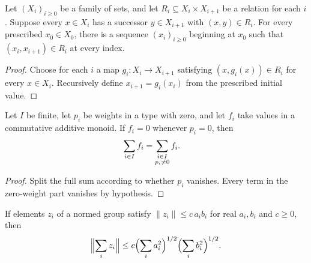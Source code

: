 \begin{lemma}
    \label{lem:dependent_sequence_choice}
    \leanok
    Let $(X_i)_{i\ge0}$ be a family of sets, and let
    $R_i\subseteq X_i\times X_{i+1}$ be a relation for each $i$.
    Suppose every $x\in X_i$ has a successor $y\in X_{i+1}$ with
    $(x,y)\in R_i$. For every prescribed $x_0\in X_0$, there is a sequence
    $(x_i)_{i\ge0}$ beginning at $x_0$ such that
    $(x_i,x_{i+1})\in R_i$ at every index.
\end{lemma}

\begin{proof}\leanok
    Choose for each $i$ a map $g_i:X_i\to X_{i+1}$ satisfying
    $(x,g_i(x))\in R_i$ for every $x\in X_i$.
    Recursively define $x_{i+1}=g_i(x_i)$ from the prescribed initial value.
\end{proof}

\begin{lemma}
    \label{lem:finset_sum_subtype_ne_zero}
    \leanok
    Let $I$ be finite, let $p_i$ be weights in a type with zero, and let $f_i$
    take values in a commutative additive monoid. If $f_i=0$ whenever $p_i=0$,
    then
    \begin{align}
        \sum_{i\in I}f_i & =\sum_{\substack{i\in I \\p_i\ne0}}f_i.
        \notag
    \end{align}
\end{lemma}

\begin{proof}\leanok
    Split the full sum according to whether $p_i$ vanishes. Every term in the
    zero-weight part vanishes by hypothesis.
\end{proof}

\begin{lemma}
    \label{lem:norm_sum_le_mul_sqrt_mul_sqrt}
    \leanok
    If elements $z_i$ of a normed group satisfy
    $\lVert z_i\rVert\le c\,a_ib_i$ for real $a_i,b_i$ and $c\ge0$, then
    \begin{align}
        \Bigl\lVert\sum_iz_i\Bigr\rVert
        \le c\Bigl(\sum_ia_i^2\Bigr)^{1/2}\Bigl(\sum_ib_i^2\Bigr)^{1/2}.
        \notag
    \end{align}
\end{lemma}

